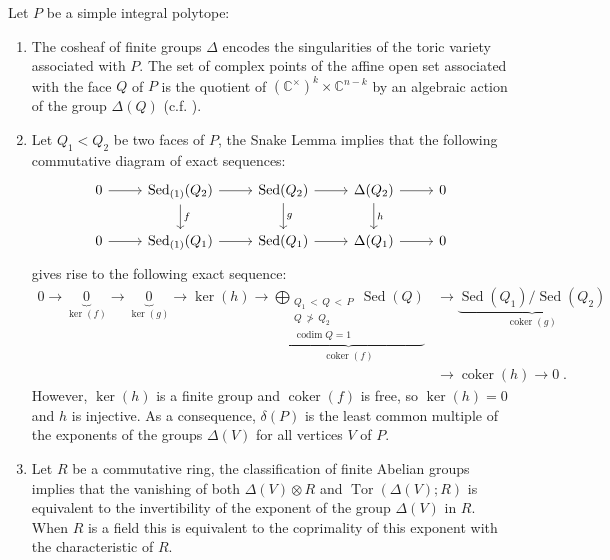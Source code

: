 \documentclass[AHL,Unicode,longabstracts,published]{cedram}
\newcommand{\C}{\mathbb{C}}
\DeclareMathOperator{\Sed}{Sed}
\DeclareMathOperator{\codim}{codim}
\DeclareMathOperator{\coker}{coker}
\DeclareMathOperator{\Tor}{Tor}
\begin{document}
\begin{remas}
Let $P$ be a simple integral polytope:
\begin{enumerate}
\item The cosheaf of finite groups $\Delta$ encodes the singularities of the toric variety associated with $P$. The set of complex points of the affine open set associated with the face $Q$ of $P$ is the quotient of $(\C^\times)^k\times\C^{n-k}$ by an algebraic action of the group $\Delta(Q)$ (c.f. \cite[Section~2.2 p.~34]{Ful_tor_var}).
\item Let $Q_1<Q_2$ be two faces of $P$, the Snake Lemma implies that the following commutative diagram of exact sequences:
\begin{equation*}
\begin{tikzcd}
0 \ar[r] & \Sed_{(1)}(Q_2) \ar[d,"f"] \ar[r] & \Sed(Q_2) \ar[d,"g"] \ar[r] & \Delta(Q_2) \ar[d,"h"] \ar[r] & 0 \\%
0 \ar[r] & \Sed_{(1)}(Q_1) \ar[r] & \Sed(Q_1) \ar[r] & \Delta(Q_1) \ar[r] & 0
\end{tikzcd}
\end{equation*}
gives rise to the following exact sequence:
\begin{align*}
0 \rightarrow \underset{\ker(f)}{\underbrace{0}} \rightarrow \underset{\ker(g)}{\underbrace{0}} \rightarrow \ker(h) \rightarrow \underset{\coker(f)}{\underbrace{\bigoplus_{\substack{Q_1\,<\,Q\,<\,P \\ Q \,\ngtr\,Q_2 \\ \codim Q=1}}\Sed(Q)}} &\rightarrow \underset{\coker(g)}{\underbrace{\Sed(Q_1)/\Sed(Q_2)}}\\
&\rightarrow \coker(h) \rightarrow 0\;.
\end{align*}
However, $\ker(h)$ is a finite group and $\coker(f)$ is free, so $\ker(h)=0$ and $h$ is injective. As a consequence, $\delta(P)$ is the least common multiple of the exponents of the groups $\Delta(V)$ for all vertices $V$ of $P$.
\item Let $R$ be a commutative ring, the classification of finite Abelian groups implies that the vanishing of both $\Delta(V)\otimes R$ and $\Tor(\Delta(V);R)$ is equivalent to the invertibility of the exponent of the group $\Delta(V)$ in $R$. When $R$ is a field this is equivalent to the coprimality of this exponent with the characteristic of $R$.
\end{enumerate}
\end{remas}
\end{document}
